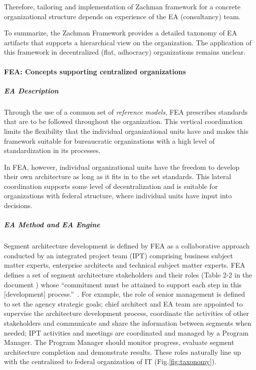 Therefore, tailoring and  implementation of Zachman framework for a concrete organizational structure depends on experience of the EA (consultancy) team.

To summarize, the Zachman Framework provides a detailed taxonomy of EA artifacts that supports a hierarchical view on the organization. The application of this framework in decentralized (flat, adhocracy) organizations remains unclear.

\paragraph*{FEA: Concepts supporting centralized organizations}
\subparagraph*{EA Description}
Through the use of a common set of \textit{reference models}, FEA prescribes standards that are to be followed throughout the organization. This vertical coordination limits the flexibility that the individual organizational units have and makes this framework suitable for bureaucratic organizations with a high level of standardization in its processes.

In FEA, however, individual organizational units have the freedom to develop their own architecture as long as it fits in to the set standards. This lateral coordination supports some level of decentralization and is suitable for organizations with federal structure, where individual units have input into decisions. 

\subparagraph*{EA Method and EA Engine}

Segment architecture development is defined by FEA as a collaborative approach conducted by an integrated project team (IPT) comprising business subject matter experts, enterprise architects and technical subject matter experts.  FEA defines a set of segment architecture stakeholders and their roles (Table 2-2 in the document \cite{FEA_PMO2007}) whose ``commitment must be attained to support each step in this [development] process.''~\cite{FEA_PMO2007}.   For example, the role of senior management is defined to set the agency strategic goals; chief architect and EA team are appointed to supervise the architecture development process, coordinate the activities of other stakeholders and communicate and share the information between segments when needed; IPT activities and meetings are coordinated and managed by a Program Manager. The Program Manager should monitor progress, evaluate segment architecture completion and demonstrate results. These roles naturally line up with the centralized to federal organization of IT (Fig.\ref{fig:taxonomy}).
 
